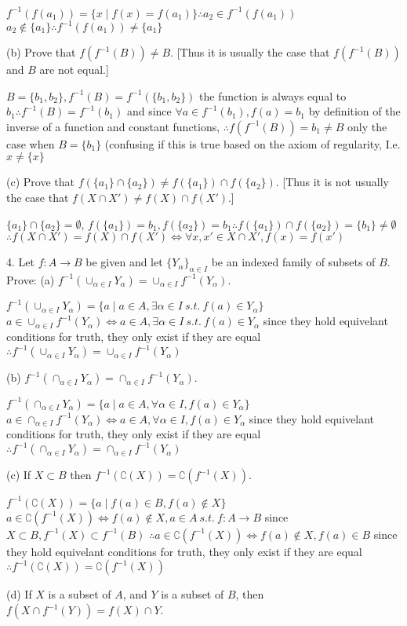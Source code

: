 $f^{-1}(f(a_{1})) = \{ x \mid f(x) = f(a_{1})\} \therefore a_{2} \in f^{-1}(f(a_{1}))$
$a_{2} \not \in \{ a_{1}\} \therefore f^{-1}(f(a_{1})) \not = \{a_{1}\}$

(b) Prove that $f(f^{-1}(B)) \not = B$. [Thus it is usually the case that $f(f^{-1}(B))$ and $B$ are not equal.]

$B = \{ b_{1}, b_{2}\}, f^{-1}(B) = f^{-1}(\{ b_{1}, b_{2}\}) $ the function is always equal  to $b_{1} \therefore f^{-1}(B) = f^{-1}(b_{1})$
and since $\forall a \in f^{-1}(b_{1}), f(a) = b_{1}$ by definition of the inverse of a function and constant functions,
$\therefore f(f^{-1}(B)) = b_{1} \not = B$ only the  case when $B = \{ b_{1}\}$ (confusing if this is true based on the axiom of regularity, I.e. $x \not = \{ x \}$

(c) Prove that $f(\{a_{1}\} \cap \{ a_{2}\} ) \not = f(\{a_{1}\}) \cap f(\{ a_{2}\})$. [Thus it is not usually the case that $f(X \cap X') \not = f(X) \cap f(X')$.]

$\{ a_{1}\} \cap \{a_{2}\} = \emptyset$, $f(\{ a_{1}\} ) = b_{1}, f(\{a_{2}\}) = b_{1} \therefore f(\{a_{1}\}) \cap f(\{ a_{2}\}) = \{b_{1}\} \not =  \emptyset$
$\therefore f(X \cap X') = f(X) \cap f(X') \iff \forall x, x' \in X \cap X', f(x) = f(x')$

4. Let $f: A \rightarrow B$ be given and let $\{ Y_{\alpha}\}_{\alpha \in I}$ be an indexed family of subsets of $B$. Prove:
(a) $f^{-1}(\cup_{\alpha \in I}Y_{\alpha}) = \cup_{\alpha \in I} f^{-1}(Y_{\alpha}) $.

$f^{-1}(\cup_{\alpha \in I} Y_{\alpha}) = \{a \mid a \in A, \exists\alpha \in I\ s.t.\  f(a) \in Y_{\alpha} \}$ 
$a \in \cup_{\alpha \in I} f^{-1}(Y_{\alpha}) \iff a \in A, \exists\alpha \in I\ s.t.\  f(a) \in Y_{\alpha} $
since they hold equivelant conditions for truth, they only exist if they are equal
$\therefore f^{-1}(\cup_{\alpha \in I}Y_{\alpha}) = \cup_{\alpha \in I} f^{-1}(Y_{\alpha})$

(b) $f^{-1}(\cap_{\alpha \in I}Y_{\alpha}) = \cap_{\alpha \in I} f^{-1}(Y_{\alpha}) $.


$f^{-1}(\cap_{\alpha \in I} Y_{\alpha}) = \{a \mid a \in A, \forall\alpha \in I, f(a) \in Y_{\alpha} \}$ 
$a \in \cap_{\alpha \in I} f^{-1}(Y_{\alpha}) \iff a \in A, \forall\alpha \in I, f(a) \in Y_{\alpha} $
since they hold equivelant conditions for truth, they only exist if they are equal
$\therefore f^{-1}(\cap_{\alpha \in I}Y_{\alpha}) = \cap_{\alpha \in I} f^{-1}(Y_{\alpha})$

(c) If $X \subset B$ then $f^{-1}(\complement(X)) = \complement(f^{-1}(X))$.


$f^{-1}(\complement(X)) = \{ a \mid f(a) \in B, f(a) \not \in X\}$
$a \in \complement(f^{-1}(X)) \iff f(a) \not \in X, a \in A\ s.t.\ f:A \rightarrow B$ since $X \subset B, f^{-1}(X) \subset f^{-1}(B)$
$\therefore a \in \complement(f^{-1}(X)) \iff f(a) \not \in X, f(a) \in B$
since they hold equivelant conditions for truth, they only exist if they are equal
$\therefore f^{-1}(\complement(X)) = \complement(f^{-1}(X))$

(d) If $X$ is a subset of $A$, and $Y$ is a subset of $B$, then $f(X \cap f^{-1}(Y)) = f(X) \cap Y$.


